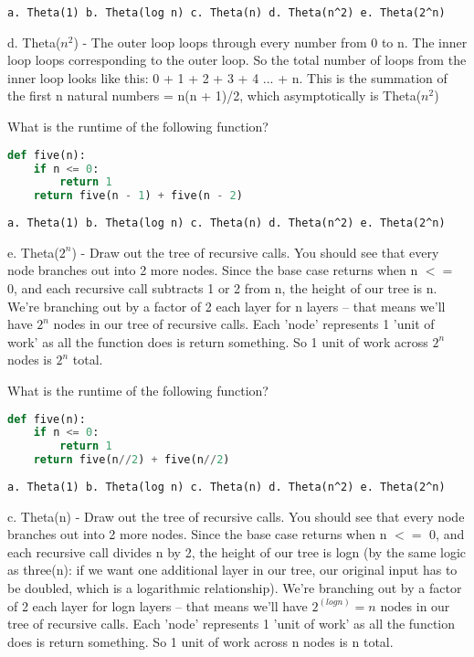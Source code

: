 \begin{verbatim}
a. Theta(1) b. Theta(log n) c. Theta(n) d. Theta(n^2) e. Theta(2^n)
\end{verbatim}
\begin{solution}
d. Theta($n^2$) - The outer loop loops through every number from 0 to n. The inner loop loops corresponding to the outer loop. So the total number of loops from the inner loop looks like this: 0 + 1 + 2 + 3 + 4 ... + n. This is the summation of the first n natural numbers = n(n + 1)/2, which asymptotically is Theta($n^2$)
\end{solution}

\question
What is the runtime of the following function?
\begin{lstlisting}[language=Python]
def five(n):
    if n <= 0:
        return 1
    return five(n - 1) + five(n - 2)
\end{lstlisting}

\begin{verbatim}
a. Theta(1) b. Theta(log n) c. Theta(n) d. Theta(n^2) e. Theta(2^n)
\end{verbatim}
\begin{solution}
e. Theta($2^n$) - Draw out the tree of recursive calls. You should see that every node branches out into 2 more nodes. Since the base case returns when n $<=$ 0, and each recursive call subtracts 1 or 2 from n, the height of our tree is n. We're branching out by a factor of 2 each layer for n layers -- that means we'll have $2^n$ nodes in our tree of recursive calls. Each 'node' represents 1 'unit of work' as all the function does is return something. So 1 unit of work across $2^n$ nodes is $2^n$ total.
\end{solution}

\question
What is the runtime of the following function?
\begin{lstlisting}[language=Python]
def five(n):
    if n <= 0:
        return 1
    return five(n//2) + five(n//2)
\end{lstlisting}

\begin{verbatim}
a. Theta(1) b. Theta(log n) c. Theta(n) d. Theta(n^2) e. Theta(2^n)
\end{verbatim}
\begin{solution}
c. Theta(n) - Draw out the tree of recursive calls. You should see that every node branches out into 2 more nodes. Since the base case returns when n $<=$ 0, and each recursive call divides n by 2, the height of our tree is logn (by the same logic as three(n): if we want one additional layer in our tree, our original input has to be doubled, which is a logarithmic relationship). We're branching out by a factor of 2 each layer for logn layers -- that means we'll have $2^(logn) = n$ nodes in our tree of recursive calls. Each 'node' represents 1 'unit of work' as all the function does is return something. So 1 unit of work across n nodes is n total.
\end{solution}